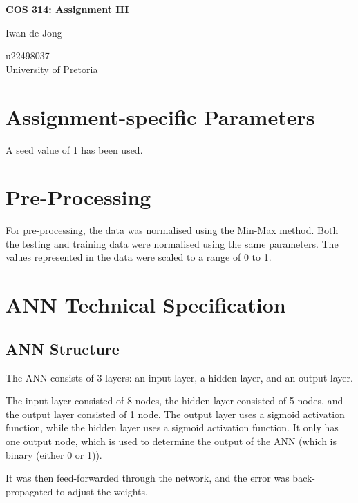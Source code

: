 \documentclass{article}
\begin{document}
\begin{titlepage}
\begin{center}


{\huge \textbf{COS 314: Assignment III}}

\vspace{2cm}

{\Large Iwan de Jong}

\vspace{1cm}

{\large u22498037 \\ 
University of Pretoria} 

\vfill

\end{center}
\end{titlepage}

\tableofcontents

\section{Assignment-specific Parameters}
A seed value of 1 has been used.

\section{Pre-Processing}
For pre-processing, the data was normalised using the Min-Max method. Both the testing and training data were normalised using the same parameters. The values represented in the data were scaled to a range of 0 to 1.

\section{ANN Technical Specification}
\subsection{ANN Structure}
The ANN consists of 3 layers: an input layer, a hidden layer, and an output layer. 

The input layer consisted of 8 nodes, the hidden layer consisted of 5 nodes, and the output layer consisted of 1 node.
The output layer uses a sigmoid activation function, while the hidden layer uses a sigmoid activation function. It only has one output node, which is used to determine the output of the ANN (which is binary (either 0 or 1)).

It was then feed-forwarded through the network, and the error was back-propagated to adjust the weights.
\end{document}

